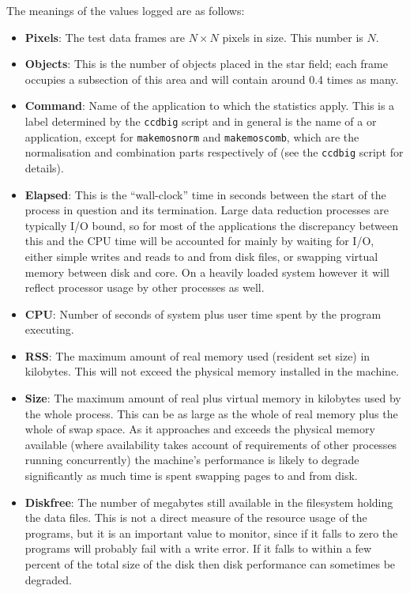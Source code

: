 The meanings of the values logged are as follows:
\begin{itemize}
%
\item {\bf Pixels}:
The test data frames are $N \times N$ pixels in size.
This number is $N$.
%
\item{\bf Objects}:
This is the number of objects placed in the star field;
each frame occupies a subsection of this area and will 
contain around 0.4 times as many.
%
\item {\bf Command}:
Name of the application to which the statistics apply.
This is a label determined by the {\tt ccdbig} script and in general
is the name of a {\CCDPref} or {\KAPPAref} application, 
except for {\tt makemosnorm} and {\tt makemoscomb},
which are the normalisation and combination parts respectively
of 
(see the {\tt ccdbig} script for details).
\item {\bf Elapsed}:
This is the ``wall-clock'' time in seconds between the start of the process
in question and its termination. 
Large data reduction processes are typically I/O bound, so
for most of the applications the discrepancy between this and the
CPU time will be accounted for mainly by waiting for I/O,
either simple writes and reads to and from disk files, 
or swapping virtual memory between disk and core.
On a heavily loaded system however it will reflect processor 
usage by other processes as well.
%
\item {\bf CPU}:
Number of seconds of system plus user time spent by the program executing.
%
\item {\bf RSS}:
The maximum amount of real memory used (resident set size) in kilobytes. 
This will not exceed the physical memory installed in the machine.
%
\item {\bf Size}:
The maximum amount of real plus virtual memory in kilobytes 
used by the whole process.
This can be as large as the whole of real memory plus the
whole of swap space. 
As it approaches and exceeds the physical memory available
(where availability takes account of requirements of other 
processes running concurrently)
the machine's performance is likely to degrade significantly 
as much time is spent swapping pages to and from disk.
%
\item {\bf Diskfree}:
The number of megabytes still available in the filesystem
holding the data files.
This is not a direct measure of the resource usage of the programs,
but it is an important value to monitor, 
since if it falls to zero the programs will probably fail with
a write error.
If it falls to within a few percent of the total size of the 
disk then disk performance can sometimes be degraded.
\end{itemize}


